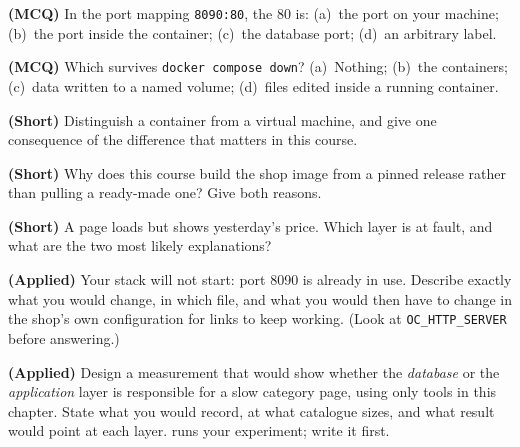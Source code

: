 \begin{reviewq}
  \item \textbf{(MCQ)} In the port mapping \texttt{8090:80}, the 80 is:
        (a)~the port on your machine; (b)~the port inside the container;
        (c)~the database port; (d)~an arbitrary label.
  \item \textbf{(MCQ)} Which survives \texttt{docker compose down}?
        (a)~Nothing; (b)~the containers; (c)~data written to a named volume;
        (d)~files edited inside a running container.
  \item \textbf{(Short)} Distinguish a container from a virtual machine, and
        give one consequence of the difference that matters in this course.
  \item \textbf{(Short)} Why does this course build the shop image from a pinned
        release rather than pulling a ready-made one? Give both reasons.
  \item \textbf{(Short)} A page loads but shows yesterday's price. Which layer
        is at fault, and what are the two most likely explanations?
  \item \textbf{(Applied)} Your stack will not start: port 8090 is already in
        use. Describe exactly what you would change, in which file, and what you
        would then have to change in the shop's own configuration for links to
        keep working. (Look at \texttt{OC\_HTTP\_SERVER} before answering.)
  \item \textbf{(Applied)} Design a measurement that would show whether the
        \emph{database} or the \emph{application} layer is responsible for a
        slow category page, using only tools in this chapter. State what you
        would record, at what catalogue sizes, and what result would point at
        each layer.  runs your experiment; write it first.
\end{reviewq}
